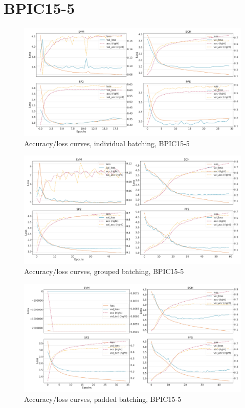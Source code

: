 \section*{BPIC15-5}
\begin{figure}[!htb]
    \centering
    \includegraphics[width=\textwidth]{gfx/bpic2015_5/individual_loss_acc_curve.pdf}
    \caption{Accuracy/loss curves, individual batching, BPIC15-5}
\end{figure}
\begin{figure}[!htb]
    \centering
    \includegraphics[width=\textwidth]{gfx/bpic2015_5/grouped_loss_acc_curve.pdf}
    \caption{Accuracy/loss curves, grouped batching, BPIC15-5}
\end{figure}
\begin{figure}[!htb]
    \centering
    \includegraphics[width=\textwidth]{gfx/bpic2015_5/padded_loss_acc_curve.pdf}
    \caption{Accuracy/loss curves, padded batching, BPIC15-5}
\end{figure}
